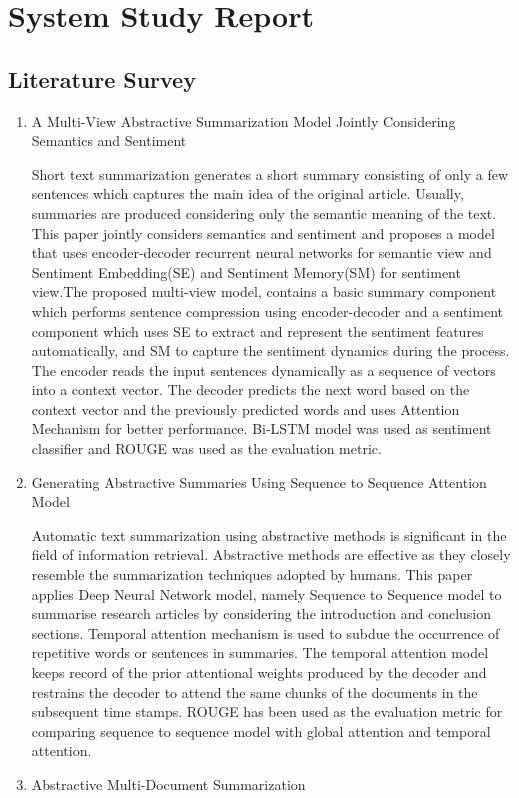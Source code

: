 \documentclass[11pt]{report}
\begin{document}
\chapter{System Study Report}
\section{Literature Survey}
\begin{enumerate}
    \item A Multi-View Abstractive Summarization Model Jointly Considering Semantics and Sentiment\cite{2}
    
    	Short text summarization generates a short summary consisting of only a few sentences which captures the main idea of the original article. Usually, summaries are produced considering only the semantic meaning of the text. This paper jointly considers semantics and sentiment and proposes a model that uses encoder-decoder recurrent neural networks for semantic view and Sentiment Embedding(SE) and Sentiment Memory(SM) for sentiment view.The proposed multi-view model, contains a basic summary component which performs sentence compression using encoder-decoder and a sentiment component which uses SE to extract and represent the sentiment features automatically, and SM to capture the sentiment dynamics during the process. The encoder reads the input sentences dynamically as a sequence of vectors into a context vector. The decoder predicts the next word based on the context vector and the previously predicted words and uses Attention Mechanism for better performance. Bi-LSTM model was used as sentiment classifier and ROUGE was used as the evaluation metric.\\

    \item Generating Abstractive Summaries Using Sequence to Sequence Attention Model\cite{3}
    
	Automatic text summarization using abstractive methods is significant in the field of information retrieval. Abstractive methods are effective as they closely resemble the summarization techniques adopted by humans. This paper applies Deep Neural Network model, namely Sequence to Sequence model to summarise research articles by considering the introduction and conclusion sections. Temporal attention mechanism is used to subdue the occurrence of repetitive words or sentences in summaries. The temporal attention model keeps record of the prior attentional weights produced by the decoder and restrains the decoder to attend the same chunks of the documents in the subsequent time stamps. ROUGE has been used as the evaluation metric for comparing sequence to sequence model with global attention and temporal attention.\\
\pagebreak
    \item Abstractive Multi-Document Summarization\cite{4}


\end{enumerate}
\end{document}
